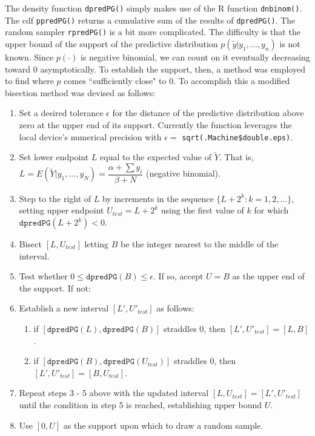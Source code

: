 \documentclass[12pt, a4paper]{article}
\begin{document}
\noindent The density function \texttt{dpredPG()} simply makes use of the R function \texttt{dnbinom()}.  The cdf \texttt{ppredPG()} returns a cumulative sum of the results of \texttt{dpredPG()}.  The random sampler \texttt{rpredPG()} is a bit more complicated. The difficulty is that the upper bound of the support of the predictive distribution $p(\tilde{y}|y_1,...,y_n)$ is not known.  Since $p(\cdot)$ is negative binomial, we can count on it eventually decreasing toward $0$ asymptotically.  To establish the support, then, a method was employed to find where $p$ comes ``sufficiently close" to $0$.  To accomplish this a modified bisection method was devised as follows:\\


    \begin{enumerate}
      \item Set a desired tolerance $\epsilon$ for the distance of the predictive distribution above zero at the upper end of its support.  Currently the function leverages the local device's numerical precision with $\epsilon = $ \texttt{sqrt(.Machine\$double.eps)}.
      \item Set lower endpoint $L$ equal to the expected value of $\tilde{Y}$.  That is, $L = E(\tilde{Y}|y_1,...,y_N) = \dfrac{\alpha+\sum{y_i}}{\beta+N}$ (negative binomial). %
      \item Step to the right of $L$ by increments in the sequence $\{L+2^k:k=1,2,...\}$, setting upper endpoint $U_{test} = L+2^k$ using the first value of $k$ for which $\texttt{dpredPG}\left(L + 2^k\right) < 0$.
      \item Bisect $[L,U_{test}]$ letting $B$ be the integer nearest to the middle of the interval.
      \item Test whether $0 \leq \texttt{dpredPG}(B) \leq \epsilon$.  If so, accept $U = B$ as the upper end of the support.  If not:
      \item Establish a new interval $[L',U'_{test}]$ as follows:
      \begin{enumerate}
        \item if $[\texttt{dpredPG}(L),\texttt{dpredPG}(B)]$ straddles $0$, then $[L',U'_{test}] = [L,B]$.
        \item if $[\texttt{dpredPG}(B),\texttt{dpredPG}(U_{test})]$ straddles $0$, then $[L',U'_{test}] = [B,U_{test}]$.
      \end{enumerate}
      \item Repeat steps 3 - 5 above with the updated interval $[L,U_{test}] = [L',U'_{test}]$ until the condition in step 5 is reached, establishing upper bound $U$.
      \item Use $[0,U]$ as the support upon which to draw a random sample.
    \end{enumerate}
\end{document}
